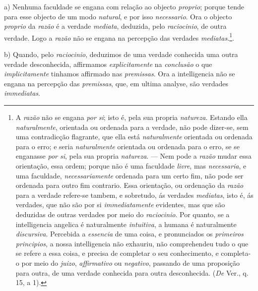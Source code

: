 a) Nenhuma faculdade se engana com relação ao objecto \emph{proprio}; porque tende para esse objecto de um modo \emph{natural}, e por isso \emph{necessario}. Ora o objecto \emph{proprio} da \emph{razão} é a verdade \emph{mediata}, deduzida, pelo \emph{raciocinio}, de outra verdade. Logo a \emph{razão} não se engana na percepção das verdades \emph{mediatas}.\footnote{A \emph{razão} não se engana \emph{por si}; isto é, pela sua propria \emph{natureza}. Estando ella \emph{naturalmente}, orientada ou ordenada para a verdade, não pode dizer-se, sem uma contradicção flagrante, que ella está \emph{naturalmente} orientada ou ordenada para o erro; e seria \emph{naturalmente} orientada ou ordenada para o erro, se se enganasse \emph{por si}, pela sua propria \emph{natureza}. --- Nem pode a \emph{razão} mudar essa orientação, essa ordem; porque não é uma faculdade \emph{livre}, mas \emph{necessaria}, e uma faculdade, \emph{necessariamente} ordenada para um certo fim, não pode ser ordenada para outro fim contrario. Essa orientação, ou ordenação da \emph{razão} para a verdade refere-se tambem, e sobretudo, ás verdades \emph{mediatas}, isto é, ás verdades, que não são por si \emph{immediatamente} evidentes, mas que são deduzidas de outras verdades por meio do \emph{raciocinio}. Por quanto, se a intelligencia angelica é naturalmente \emph{intuitiva}, a humana é naturalmente \emph{discursiva}. Percebida a \emph{essencia} de uma coisa, e pronunciados os \emph{primeiros principios}, a nossa intelligencia não exhauriu, não comprehendeu tudo o que se refere a essa coisa, e precisa de completar o seu conhecimento, e completa-o por meio do \emph{juizo}, \emph{affirmativo} ou \emph{negativo}, passando de uma proposição para outra, de uma verdade conhecida para outra desconhecida. (\emph{De} Ver., q. 15, a 1).}.

b) Quando, pelo \emph{raciocinio}, deduzimos de uma verdade conhecida uma outra verdade desconhecida, affirmamos \emph{explicitamente} na \emph{conclusão} o que \emph{implicitamente} tinhamos affirmado nas \emph{premissas}. Ora a intelligencia não se engana na percepção das \emph{premissas}, que, em ultima analyse, são verdades \emph{immediatas}.

